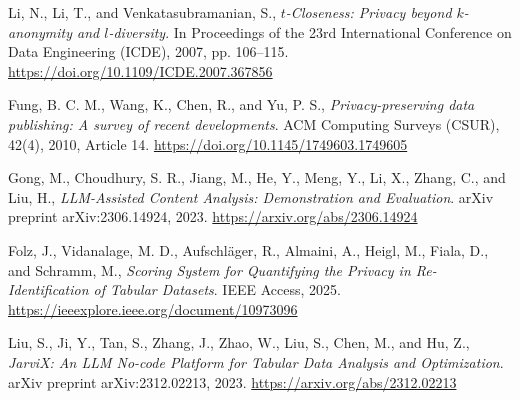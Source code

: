 \documentclass{article}
\begin{document}
\begin{thebibliography}{9}
Li, N., Li, T., and Venkatasubramanian, S.,
\emph{$t$-Closeness: Privacy beyond $k$-anonymity and $l$-diversity}. In Proceedings of the 23rd International Conference on Data Engineering (ICDE), 2007, pp. 106–115.
\href{https://doi.org/10.1109/ICDE.2007.367856}{https://doi.org/10.1109/ICDE.2007.367856}

Fung, B. C. M., Wang, K., Chen, R., and Yu, P. S.,
\emph{Privacy-preserving data publishing: A survey of recent developments}. ACM Computing Surveys (CSUR), 42(4), 2010, Article 14.
\href{https://doi.org/10.1145/1749603.1749605}{https://doi.org/10.1145/1749603.1749605}





Gong, M., Choudhury, S. R., Jiang, M., He, Y., Meng, Y., Li, X., Zhang, C., and Liu, H.,
\emph{LLM-Assisted Content Analysis: Demonstration and Evaluation}. arXiv preprint arXiv:2306.14924, 2023.
\href{https://arxiv.org/abs/2306.14924}{https://arxiv.org/abs/2306.14924}

Folz, J., Vidanalage, M. D., Aufschläger, R., Almaini, A., Heigl, M., Fiala, D., and Schramm, M.,
\emph{Scoring System for Quantifying the Privacy in Re-Identification of Tabular Datasets}. IEEE Access, 2025.
\href{https://ieeexplore.ieee.org/document/10973096}{https://ieeexplore.ieee.org/document/10973096}

Liu, S., Ji, Y., Tan, S., Zhang, J., Zhao, W., Liu, S., Chen, M., and Hu, Z.,
\emph{JarviX: An LLM No-code Platform for Tabular Data Analysis and Optimization}. arXiv preprint arXiv:2312.02213, 2023.
\href{https://arxiv.org/abs/2312.02213}{https://arxiv.org/abs/2312.02213}



\end{thebibliography}
\end{document}
